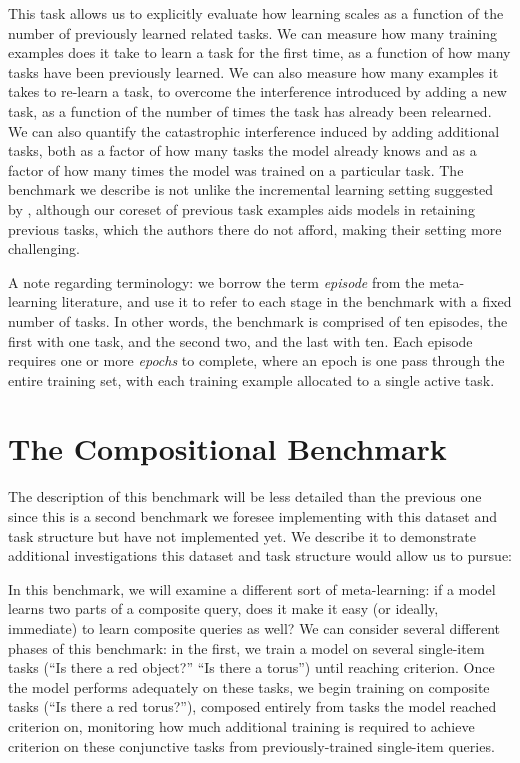 This task allows us to explicitly evaluate how learning scales as a function of the number of previously learned related tasks. We can measure how many training examples does it take to learn a task for the first time, as a function of how many tasks have been previously learned. We can also measure how many examples it takes to re-learn a task, to overcome the interference introduced by adding a new task, as a function of the number of times the task has already been relearned. We can also quantify the catastrophic interference induced by adding additional tasks, both as a factor of how many tasks the model already knows and as a factor of how many times the model was trained on a particular task. The benchmark we describe is not unlike the incremental learning setting suggested by \textcite{Kemker2017a}, although our coreset of previous task examples aids models in retaining previous tasks, which the authors there do not afford, making their setting more challenging.

A note regarding terminology: we borrow the term \emph{episode} from the meta-learning literature, and use it to refer to each stage in the benchmark with a fixed number of tasks. In other words, the benchmark is comprised of ten episodes, the first with one task, and the second two, and the last with ten. Each episode requires one or more \emph{epochs} to complete, where an epoch is one pass through the entire training set, with each training example allocated to a single active task. 

\section{The Compositional Benchmark}
The description of this benchmark will be less detailed than the previous one since this is a second benchmark we foresee implementing with this dataset and task structure but have not implemented yet. We describe it to demonstrate additional investigations this dataset and task structure would allow us to pursue: 

In this benchmark, we will examine a different sort of meta-learning: if a model learns two parts of a composite query, does it make it easy (or ideally, immediate) to learn composite queries as well? We can consider several different phases of this benchmark: in the first, we train a model on several single-item tasks (``Is there a red object?'' ``Is there a torus'') until reaching criterion. Once the model performs adequately on these tasks, we begin training on composite tasks (``Is there a red torus?''), composed entirely from tasks the model reached criterion on, monitoring how much additional training is required to achieve criterion on these conjunctive tasks from previously-trained single-item queries. 

